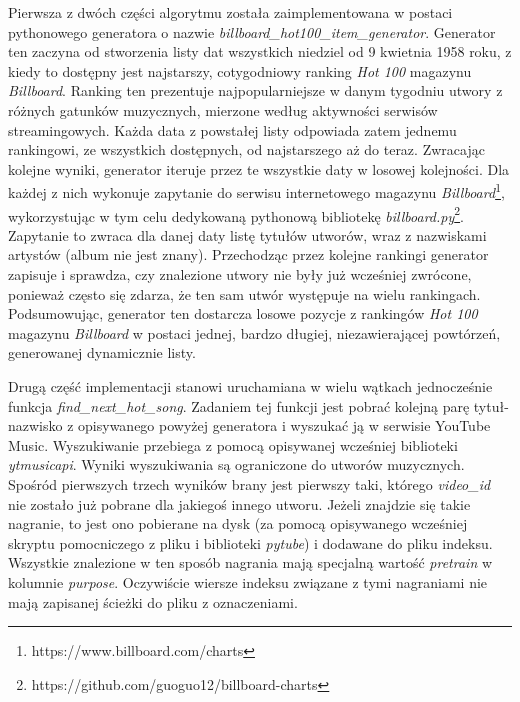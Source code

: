 Pierwsza z dwóch części algorytmu została zaimplementowana w postaci pythonowego generatora o nazwie
\emph{billboard\_hot100\_item\_generator}. Generator ten zaczyna od stworzenia listy dat wszystkich
niedziel od 9 kwietnia 1958 roku, z kiedy to dostępny jest najstarszy, cotygodniowy ranking
\emph{Hot 100} magazynu \emph{Billboard}. Ranking ten prezentuje najpopularniejsze w danym tygodniu
utwory z różnych gatunków muzycznych, mierzone według aktywności serwisów streamingowych. Każda data
z powstałej listy odpowiada zatem jednemu rankingowi, ze wszystkich dostępnych, od najstarszego aż
do teraz. Zwracając kolejne wyniki, generator iteruje przez te wszystkie daty w losowej kolejności.
Dla każdej z nich wykonuje zapytanie do serwisu internetowego magazynu
\emph{Billboard}\footnote{https://www.billboard.com/charts}, wykorzystując w tym celu dedykowaną
pythonową bibliotekę \emph{billboard.py}\footnote{https://github.com/guoguo12/billboard-charts}.
Zapytanie to zwraca dla danej daty listę tytułów utworów, wraz z nazwiskami artystów (album nie jest
znany). Przechodząc przez kolejne rankingi generator zapisuje i sprawdza, czy znalezione utwory nie
były już wcześniej zwrócone, ponieważ często się zdarza, że ten sam utwór występuje na wielu
rankingach. Podsumowując, generator ten dostarcza losowe pozycje z rankingów \emph{Hot 100} magazynu
\emph{Billboard} w postaci jednej, bardzo długiej, niezawierającej powtórzeń, generowanej
dynamicznie listy.

Drugą część implementacji stanowi uruchamiana w wielu wątkach jednocześnie funkcja
\emph{find\_next\_hot\_song}. Zadaniem tej funkcji jest pobrać kolejną parę tytuł-nazwisko z
opisywanego powyżej generatora i wyszukać ją w serwisie YouTube Music. Wyszukiwanie przebiega z
pomocą opisywanej wcześniej biblioteki \emph{ytmusicapi}. Wyniki wyszukiwania są ograniczone do
utworów muzycznych. Spośród pierwszych trzech wyników brany jest pierwszy taki, którego
\emph{video\_id} nie zostało już pobrane dla jakiegoś innego utworu. Jeżeli znajdzie się takie
nagranie, to jest ono pobierane na dysk (za pomocą opisywanego wcześniej skryptu pomocniczego z
pliku i biblioteki \emph{pytube}) i dodawane do pliku indeksu. Wszystkie znalezione w ten sposób
nagrania mają specjalną wartość \emph{pretrain} w kolumnie \emph{purpose}. Oczywiście wiersze
indeksu związane z tymi nagraniami nie mają zapisanej ścieżki do pliku z oznaczeniami.

